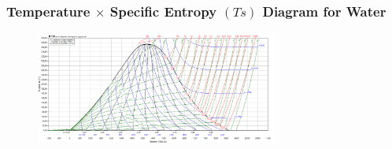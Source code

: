 \documentclass[10pt,compress,handout,unknownkeysallowed]{beamer}
\begin{document}

\begin{frame}
 \frametitle{Temperature $\times$ Specific Entropy $(Ts)$ Diagram for Water}
  \begin{center}
   \begin{figure}
     \includegraphics[width=8cm,height=7.cm,clip]{../Pics/water_TS.png}
   \end{figure}
   \end{center}
\end{frame}
\end{document}
